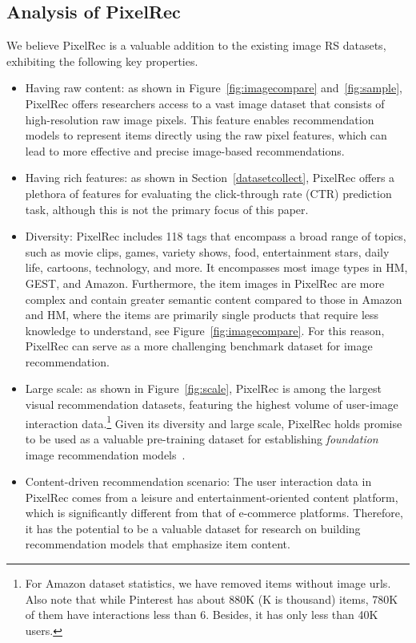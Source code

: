 \documentclass[sigconf]{acmart}
\begin{document}
\subsection{Analysis of PixelRec} 
We believe PixelRec is a valuable addition to the existing image RS datasets, exhibiting the following key properties.
\begin{itemize}
	\item Having raw content:  as shown  in Figure~\ref{fig:imagecompare} and~\ref{fig:sample},  PixelRec  offers researchers access to a vast image dataset that consists of high-resolution raw image pixels. This feature enables recommendation models to represent items directly using the raw pixel features, which can lead to more effective and precise image-based recommendations.
\item Having rich features: 
	as shown in Section~\ref{datasetcollect}, PixelRec offers  a plethora of  features for evaluating the click-through rate (CTR) prediction task, although this is not the primary focus of this paper.  \item Diversity: PixelRec includes 118 tags  that encompass a broad range of topics, such as movie clips, games, variety shows, food, entertainment stars, daily life, cartoons, technology, and more.
	It  encompasses most image types in HM, GEST, and Amazon. Furthermore, the item images in PixelRec are more complex and contain greater semantic content compared to those in Amazon and HM, where the items are primarily single products that require less knowledge to understand, see Figure~\ref{fig:imagecompare}.  For this reason, PixelRec can serve as a more challenging   benchmark dataset for image recommendation.
	\item Large scale: as shown in Figure~\ref{fig:scale}, PixelRec is among the largest visual recommendation datasets, featuring the highest volume of user-image interaction data.\footnote{
		For Amazon dataset statistics, we have removed items without image urls. Also note that while Pinterest has about 880K (K is thousand) items, 780K of them have interactions less than 6. Besides, it has only less than 40K users.}
Given its diversity and large scale, PixelRec holds promise to be used as a valuable pre-training dataset for establishing \textit{foundation} image recommendation 
models~\cite{bommasani2021opportunities}.



\item Content-driven recommendation scenario: The user interaction data in PixelRec comes from a leisure and entertainment-oriented content platform, which is significantly different from that of e-commerce platforms. Therefore, it has the potential to be a valuable dataset for research on building recommendation models that emphasize item content.






\end{itemize}
\end{document}
